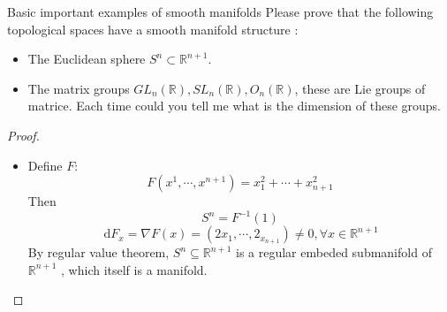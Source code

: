 \documentclass[../main.tex]{subfiles}
\begin{document}
\begin{exercise}{Basic important examples of smooth manifolds}{}
Please prove that the following topological spaces have a smooth manifold structure :
\begin{itemize}
    \item The Euclidean sphere $S^n \subset \mathbb{R}^{n+1}$.
    \item The matrix groups $GL_n(\mathbb{R}), SL_n(\mathbb{R}), O_n(\mathbb{R})$, these are Lie groups of matrice. Each time could you tell me what is the dimension of these groups.
\end{itemize}
\end{exercise}
\begin{proof}
 \begin{itemize}
    \item Define \(  F  \): \[
    F\left( x^{1},\cdots ,x^{n+ 1} \right)= x_1^{2}+ \cdots + x_{n+ 1}^{2} 
    \]  Then \[
    S^{n}=  F^{-1} \left( 1 \right) 
    \] \[
    \,\mathrm{d} F_{x}= \nabla F\left( x \right)= \left( 2x_1,\cdots ,2_{x_{n+ 1}} \right)    \neq 0 ,\forall x \in \mathbb{R} ^{n+ 1}
    \]By regular value theorem, \(  S^{n}\subseteq \mathbb{R} ^{n+ 1}  \)  is a regular embeded submanifold  of \(  \mathbb{R} ^{n+ 1}  \) , which  itself is a  manifold.  
    

\end{itemize}
\end{proof}
\end{document}

